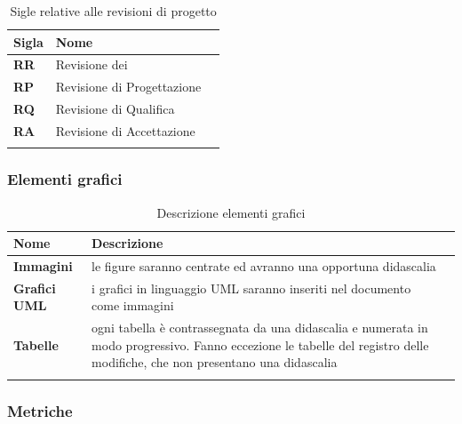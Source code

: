 {{		\setlength{\freewidth}{\dimexpr\textwidth-1\tabcolsep}
	\renewcommand{\arraystretch}{1.5}
	\setlength{\aboverulesep}{0pt}
	\setlength{\belowrulesep}{0pt}
	\begin{longtable}{L{.1\freewidth} L{.3\freewidth} L{.080\freewidth}}
		\toprule 
		\textbf{Sigla} & \textbf{Nome} \\
		\toprule
		\endhead		
		 \textbf{RR}& Revisione dei  \\
		 \textbf{RP} & Revisione di Progettazione \\
		 \textbf{RQ} & Revisione di Qualifica \\
		 \textbf{RA} & Revisione di Accettazione \\
		 

		\bottomrule
		\hiderowcolors
		\caption{Sigle relative alle revisioni di progetto}
	\end{longtable}	
\subsubsection{Elementi grafici}

	\setlength{\freewidth}{\dimexpr\textwidth-1\tabcolsep}
	\renewcommand{\arraystretch}{1.5}
	\setlength{\aboverulesep}{0pt}
	\setlength{\belowrulesep}{0pt}
	\begin{longtable}{L{.2\freewidth} L{.6\freewidth} L{.080\freewidth}}
		\toprule 
		\textbf{Nome} & \textbf{Descrizione} \\
		\toprule
		\endhead		
		 \textbf{Immagini} & le figure saranno centrate ed avranno una opportuna didascalia \\
		  \textbf{Grafici UML} & i grafici in linguaggio UML saranno inseriti nel documento come immagini \\
		  \textbf{Tabelle} & ogni tabella è contrassegnata da una didascalia e numerata in modo progressivo. Fanno eccezione le tabelle del registro delle modifiche, che non presentano una didascalia \\
		 

		\bottomrule
		\hiderowcolors
		\caption{Descrizione elementi grafici}
	\end{longtable}	

\subsubsection{Metriche}

}}
